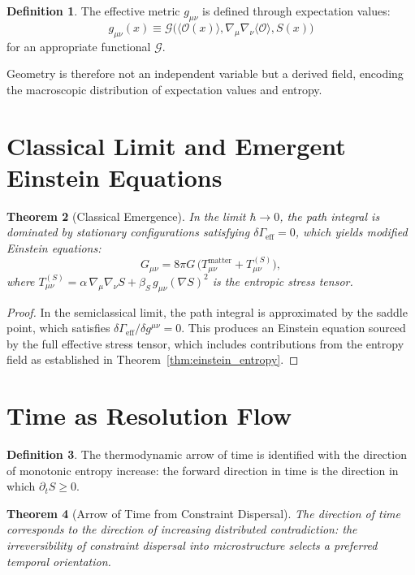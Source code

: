\documentclass[12pt,a4paper,openany]{book}
\theoremstyle{plain}
\newtheorem{theorem}{Theorem}[chapter]
\theoremstyle{definition}
\newtheorem{definition}[theorem]{Definition}
\theoremstyle{remark}
\begin{document}
\begin{definition}
The effective metric $g_{\mu\nu}$ is defined through expectation values:
\[
g_{\mu\nu}(x) \equiv \mathcal{G}\bigl(\langle\mathcal{O}(x)\rangle, \nabla_\mu\nabla_\nu\langle\mathcal{O}\rangle, S(x)\bigr)
\]
for an appropriate functional $\mathcal{G}$.
\end{definition}

Geometry is therefore not an independent variable but a derived field, encoding the macroscopic distribution of expectation values and entropy.

\section{Classical Limit and Emergent Einstein Equations}

\begin{theorem}[Classical Emergence]
\label{thm:classical_emergence}
In the limit $\hbar \to 0$, the path integral is dominated by stationary configurations satisfying $\delta\Gamma_{\mathrm{eff}} = 0$, which yields modified Einstein equations:
\[
G_{\mu\nu} = 8\pi G\,\bigl(T_{\mu\nu}^{\mathrm{matter}} + T_{\mu\nu}^{(S)}\bigr),
\]
where $T_{\mu\nu}^{(S)} = \alpha\,\nabla_\mu\nabla_\nu S + \beta_S\,g_{\mu\nu}(\nabla S)^2$ is the entropic stress tensor.
\end{theorem}

\begin{proof}
In the semiclassical limit, the path integral is approximated by the saddle point, which satisfies $\delta\Gamma_{\mathrm{eff}}/\delta g^{\mu\nu} = 0$. This produces an Einstein equation sourced by the full effective stress tensor, which includes contributions from the entropy field as established in Theorem~\ref{thm:einstein_entropy}.
\end{proof}

\section{Time as Resolution Flow}

\begin{definition}
The thermodynamic arrow of time is identified with the direction of monotonic entropy increase: the forward direction in time is the direction in which $\partial_t S \ge 0$.
\end{definition}

\begin{theorem}[Arrow of Time from Constraint Dispersal]
\label{thm:time_arrow}
The direction of time corresponds to the direction of increasing distributed contradiction: the irreversibility of constraint dispersal into microstructure selects a preferred temporal orientation.
\end{theorem}
\end{document}
